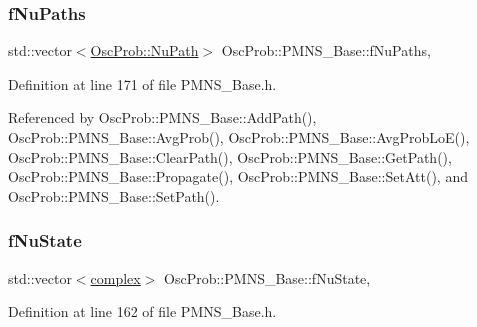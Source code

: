 \mbox{\label{classOscProb_1_1PMNS__Base_a69db9d57e12fc7cbe0431bc6c18fac93}} 
\subsubsection{\texorpdfstring{f\+Nu\+Paths}{fNuPaths}}
{\footnotesize\ttfamily std\+::vector$<$\hyperlink{structOscProb_1_1NuPath}{Osc\+Prob\+::\+Nu\+Path}$>$ Osc\+Prob\+::\+P\+M\+N\+S\+\_\+\+Base\+::f\+Nu\+Paths\hspace{0.3cm}{\ttfamily [protected]}, {\ttfamily [inherited]}}



Definition at line 171 of file P\+M\+N\+S\+\_\+\+Base.\+h.



Referenced by Osc\+Prob\+::\+P\+M\+N\+S\+\_\+\+Base\+::\+Add\+Path(), Osc\+Prob\+::\+P\+M\+N\+S\+\_\+\+Base\+::\+Avg\+Prob(), Osc\+Prob\+::\+P\+M\+N\+S\+\_\+\+Base\+::\+Avg\+Prob\+Lo\+E(), Osc\+Prob\+::\+P\+M\+N\+S\+\_\+\+Base\+::\+Clear\+Path(), Osc\+Prob\+::\+P\+M\+N\+S\+\_\+\+Base\+::\+Get\+Path(), Osc\+Prob\+::\+P\+M\+N\+S\+\_\+\+Base\+::\+Propagate(), Osc\+Prob\+::\+P\+M\+N\+S\+\_\+\+Base\+::\+Set\+Att(), and Osc\+Prob\+::\+P\+M\+N\+S\+\_\+\+Base\+::\+Set\+Path().

\mbox{\label{classOscProb_1_1PMNS__Base_ad38a7107c3ab393591fd5ba21658300b}} 
\subsubsection{\texorpdfstring{f\+Nu\+State}{fNuState}}
{\footnotesize\ttfamily std\+::vector$<$\hyperlink{classOscProb_1_1PMNS__Base_ae86ec4718808ce9d02e5f5b4226714ab}{complex}$>$ Osc\+Prob\+::\+P\+M\+N\+S\+\_\+\+Base\+::f\+Nu\+State\hspace{0.3cm}{\ttfamily [protected]}, {\ttfamily [inherited]}}



Definition at line 162 of file P\+M\+N\+S\+\_\+\+Base.\+h.




